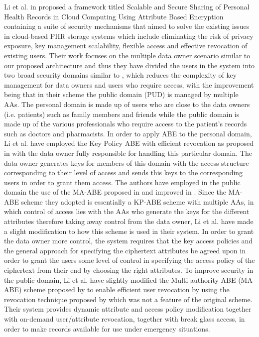 Li et al. in \cite{Li2013} proposed a framework titled Scalable and Secure Sharing of Personal Health Records in Cloud Computing Using Attribute Based Encryption containing a suite of security mechanisms that aimed to solve the existing issues in cloud-based PHR storage systems which include eliminating the risk of privacy exposure, key management scalability, flexible access and effective revocation of existing users. Their work focuses on the multiple data owner scenario similar to our proposed architecture and thus they have divided the users in the system into two broad security domains similar to \cite{Ibraimi2010}, which reduces the complexity of key management for data owners and users who require access, with the improvement being that in their scheme the public domain (PUD) is managed by multiple AAs. The personal domain is made up of users who are close to the data owners (i.e. patients) such as family members and friends while the public domain is made up of the various professionals who require access to the patient’s records such as doctors and pharmacists. In order to apply ABE to the personal domain, Li et al. have employed the Key Policy ABE with efficient revocation as proposed in \cite{Yu2010a} with the data owner fully responsible for handling this particular domain. The data owner generates keys for members of this domain with the access structure corresponding to their level of access and sends this keys to the corresponding users in order to grant them access. The authors have employed in the public domain the use of the MA-ABE proposed in \cite{Chase2007} and improved in \cite{Chase2009}. Since the MA-ABE scheme they adopted is essentially a KP-ABE scheme with multiple AAs, in which control of access lies with the AAs who generate the keys for the different attributes therefore taking away control from the data owner, Li et al. have made a slight modification to how this scheme is used in their system. In order to grant the data owner more control, the system requires that the key access policies and the general approach for specifying the ciphertext attributes be agreed upon in order to grant the users some level of control in specifying the access policy of the ciphertext from their end by choosing the right attributes. To improve security in the public domain, Li et al. have slightly modified the Multi-authority ABE (MA-ABE) scheme proposed by \cite{Chase2009} to enable efficient user revocation by using the revocation technique proposed by \cite{Yu2010a} which was not a feature of the original scheme. Their system provides dynamic attribute and access policy modification together with on-demand user/attribute revocation, together with break glass access, in order to make records available for use under emergency situations.

